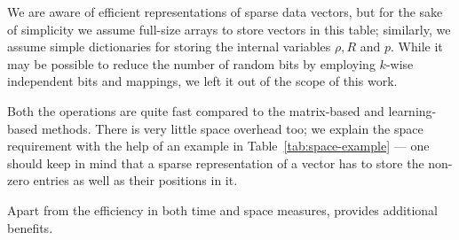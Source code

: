 \indent We are aware of efficient representations of sparse data vectors, but for the sake of simplicity we assume full-size arrays to store vectors in this table; similarly, we assume simple dictionaries for storing the internal variables $\rho,R$ and $p$. While it may be possible to reduce the number of random bits by employing $k$-wise independent bits and mappings, we left it out of the scope of this work.  


Both the operations are quite fast compared to the matrix-based and learning-based methods. There is very little space overhead too; we explain the space requirement with the help of an example in Table~\ref{tab:space-example} --- one should keep in mind that a sparse representation of a vector has to store the non-zero
entries as well as their positions in it.

Apart from the efficiency in both time and space measures, \fsketch provides additional benefits. 

